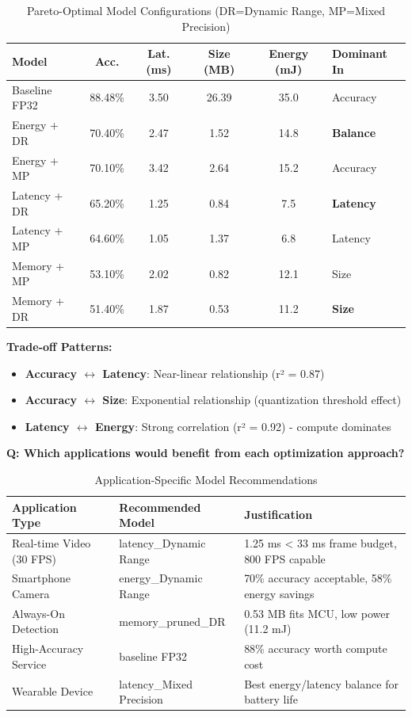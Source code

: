 \documentclass[10pt, a4paper]{article}
\begin{document}
\begin{table}[H]
\centering
\scriptsize
\begin{tabular}{|l|c|c|c|c|l|}
\hline
\textbf{Model} & \textbf{Acc.} & \textbf{Lat. (ms)} & \textbf{Size (MB)} & \textbf{Energy (mJ)} & \textbf{Dominant In} \\
\hline
Baseline FP32 & 88.48\% & 3.50 & 26.39 & 35.0 & Accuracy \\
Energy + DR & 70.40\% & 2.47 & 1.52 & 14.8 & \textbf{Balance} \\
Energy + MP & 70.10\% & 3.42 & 2.64 & 15.2 & Accuracy \\
Latency + DR & 65.20\% & 1.25 & 0.84 & 7.5 & \textbf{Latency} \\
Latency + MP & 64.60\% & 1.05 & 1.37 & 6.8 & Latency \\
Memory + MP & 53.10\% & 2.02 & 0.82 & 12.1 & Size \\
Memory + DR & 51.40\% & 1.87 & 0.53 & 11.2 & \textbf{Size} \\
\hline
\end{tabular}
\caption{Pareto-Optimal Model Configurations (DR=Dynamic Range, MP=Mixed Precision)}
\end{table}

\textbf{Trade-off Patterns:}
\begin{itemize}
    \item \textbf{Accuracy $\leftrightarrow$ Latency}: Near-linear relationship (r² = 0.87)
    \item \textbf{Accuracy $\leftrightarrow$ Size}: Exponential relationship (quantization threshold effect)
    \item \textbf{Latency $\leftrightarrow$ Energy}: Strong correlation (r² = 0.92) - compute dominates
\end{itemize}

\textbf{Q: Which applications would benefit from each optimization approach?}

\begin{table}[H]
\centering
\footnotesize
\begin{tabular}{|p{3.5cm}|p{4cm}|p{5.5cm}|}
\hline
\textbf{Application Type} & \textbf{Recommended Model} & \textbf{Justification} \\
\hline
Real-time Video (30 FPS) & latency\_Dynamic Range & 1.25 ms < 33 ms frame budget, 800 FPS capable \\
\hline
Smartphone Camera & energy\_Dynamic Range & 70\% accuracy acceptable, 58\% energy savings \\
\hline
Always-On Detection & memory\_pruned\_DR & 0.53 MB fits MCU, low power (11.2 mJ) \\
\hline
High-Accuracy Service & baseline FP32 & 88\% accuracy worth compute cost \\
\hline
Wearable Device & latency\_Mixed Precision & Best energy/latency balance for battery life \\
\hline
\end{tabular}
\caption{Application-Specific Model Recommendations}
\end{table}
\end{document}

